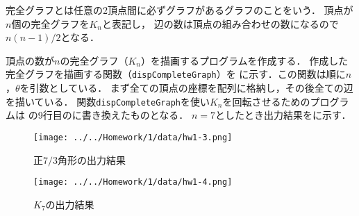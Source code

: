 

\vspace{-\baselineskip}



完全グラフとは任意の2頂点間に必ずグラフがあるグラフのことをいう．
頂点が$n$個の完全グラフを$K_{n}$と表記し，
辺の数は頂点の組み合わせの数になるので$n(n-1) / 2$となる．\cite{Complete}



頂点の数が$n$の完全グラフ（$K_{n}$）を描画するプログラムを作成する．
作成した完全グラフを描画する関数（\texttt{dispCompleteGraph}）を
に示す．この関数は順に$n$，$\theta$を引数としている．
まず全ての頂点の座標を配列に格納し，その後全ての辺を描いている．
関数\texttt{dispCompleteGraph}を使い$K_{n}$を回転させるためのプログラムは
の9行目のに書き換えたものとなる．
$n = 7$としたとき出力結果をに示す．





\begin{figure}[htbp]
	\centering
	\begin{minipage}[b]{0.45\textwidth}
		\centering
		\texttt{[image: ../../Homework/1/data/hw1-3.png]}
		\caption{正$7/3$角形の出力結果}
		\label{fig:hw1-3}
	\end{minipage}
	\begin{minipage}[b]{0.45\textwidth}
		\centering
		\texttt{[image: ../../Homework/1/data/hw1-4.png]}
		\caption{$K_{7}$の出力結果}
		\label{fig:hw1-4}
	\end{minipage}
\end{figure}


